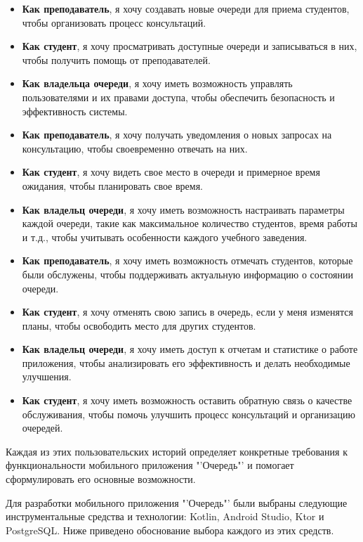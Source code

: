 \begin{itemize}
	\item \textbf{Как преподаватель}, я хочу создавать новые очереди
		для приема студентов, чтобы организовать процесс консультаций.
	\item \textbf{Как студент}, я хочу просматривать доступные очереди
		и записываться в них, чтобы получить помощь от преподавателей.
	\item \textbf{Как владельца очереди}, я хочу иметь возможность управлять
		пользователями и их правами доступа, чтобы обеспечить безопасность
		и эффективность системы.
	\item \textbf{Как преподаватель}, я хочу получать уведомления
		о новых запросах на консультацию, чтобы своевременно отвечать на них.
	\item \textbf{Как студент}, я хочу видеть свое место в очереди
		и примерное время ожидания, чтобы планировать свое время.
	\item \textbf{Как владельц очереди}, я хочу иметь возможность настраивать
		параметры каждой очереди, такие как максимальное количество студентов,
		время работы и т.д.,
		чтобы учитывать особенности каждого учебного заведения.
	\item \textbf{Как преподаватель}, я хочу иметь возможность отмечать
		студентов, которые были обслужены,
		чтобы поддерживать актуальную информацию о состоянии очереди.
	\item \textbf{Как студент}, я хочу отменять свою запись в очередь,
		если у меня изменятся планы,
		чтобы освободить место для других студентов.
	\item \textbf{Как владельц очереди}, я хочу иметь доступ к отчетам
		и статистике о работе приложения,
		чтобы анализировать его эффективность и делать необходимые улучшения.
	\item \textbf{Как студент}, я хочу иметь возможность оставить обратную
		связь о качестве обслуживания,
		чтобы помочь улучшить процесс консультаций и организацию очередей.
\end{itemize}

Каждая из этих пользовательских историй определяет конкретные требования
к функциональности мобильного приложения "'Очередь"'
и помогает сформулировать его основные возможности.


Для разработки мобильного приложения "'Очередь"' были выбраны следующие
инструментальные средства и технологии:
Kotlin, Android Studio, Ktor и PostgreSQL.
Ниже приведено обоснование выбора каждого из этих средств.

